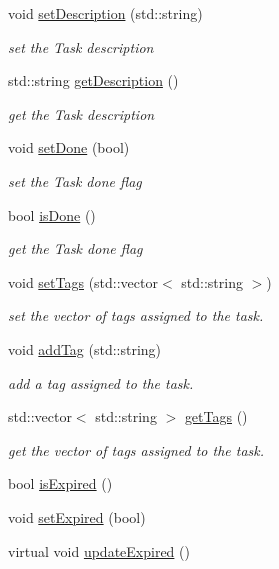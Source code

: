 \begin{DoxyCompactItemize}
void \hyperlink{class_do_lah_1_1_abstract_task_a32653fb2aae95d9d8fda718cfd73e360}{set\+Description} (std\+::string)
\begin{DoxyCompactList}\small\item\em set the Task description \end{DoxyCompactList}\item 
std\+::string \hyperlink{class_do_lah_1_1_abstract_task_a309b9fded6b35e7373dbd045115d7e77}{get\+Description} ()
\begin{DoxyCompactList}\small\item\em get the Task description \end{DoxyCompactList}\item 
void \hyperlink{class_do_lah_1_1_abstract_task_afc71900760187a03038f0780cce78897}{set\+Done} (bool)
\begin{DoxyCompactList}\small\item\em set the Task done flag \end{DoxyCompactList}\item 
bool \hyperlink{class_do_lah_1_1_abstract_task_a758742a67d1f74ab80bfb81c6ec5a4ab}{is\+Done} ()
\begin{DoxyCompactList}\small\item\em get the Task done flag \end{DoxyCompactList}\item 
void \hyperlink{class_do_lah_1_1_abstract_task_ae87df86920dcaaf1353a412269d73727}{set\+Tags} (std\+::vector$<$ std\+::string $>$)
\begin{DoxyCompactList}\small\item\em set the vector of tags assigned to the task. \end{DoxyCompactList}\item 
void \hyperlink{class_do_lah_1_1_abstract_task_a6b47fd0b29884cbc26833cb1c6af4e29}{add\+Tag} (std\+::string)
\begin{DoxyCompactList}\small\item\em add a tag assigned to the task. \end{DoxyCompactList}\item 
std\+::vector$<$ std\+::string $>$ \hyperlink{class_do_lah_1_1_abstract_task_a940dc50582e060429e987b90ab58d685}{get\+Tags} ()
\begin{DoxyCompactList}\small\item\em get the vector of tags assigned to the task. \end{DoxyCompactList}\item 
bool \hyperlink{class_do_lah_1_1_abstract_task_a915a202277d840a8c1df2abb042f7801}{is\+Expired} ()
\item 
void \hyperlink{class_do_lah_1_1_abstract_task_ada5ad524823b580ce205b77b6ce50b50}{set\+Expired} (bool)
\item 
virtual void \hyperlink{class_do_lah_1_1_abstract_task_a51e072bcd3e1e32dfb16c3950e5ce99d}{update\+Expired} ()
\end{DoxyCompactItemize}
